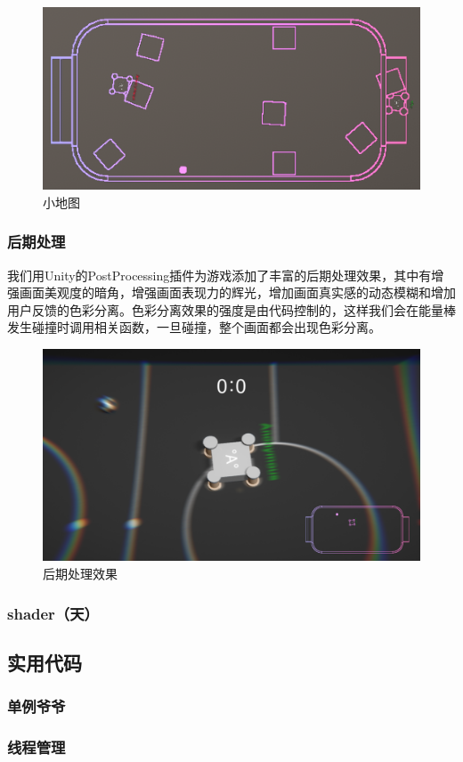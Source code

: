 \documentclass[conference]{IEEEtran}
\begin{document}
\begin{figure}[htbp]
  \centerline{\includegraphics[width=.38\textwidth]{images/mini-map.png}}
  \caption{小地图}
  \label{fig:minimap}
\end{figure}

\subsubsection{后期处理}
我们用Unity的PostProcessing插件为游戏添加了丰富的后期处理效果，其中有增强画面美观度的暗角，增强画面表现力的辉光，增加画面真实感的动态模糊和增加用户反馈的色彩分离。色彩分离效果的强度是由代码控制的，这样我们会在能量棒发生碰撞时调用相关函数，一旦碰撞，整个画面都会出现色彩分离。

\begin{figure}[htbp]
  \centerline{\includegraphics[width=.38\textwidth]{images/pp.png}}
  \caption{后期处理效果}
  \label{fig:pp}
\end{figure}

\subsubsection{shader（天）}


\subsection{实用代码}
\subsubsection{单例爷爷}
\subsubsection{线程管理}
\end{document}
